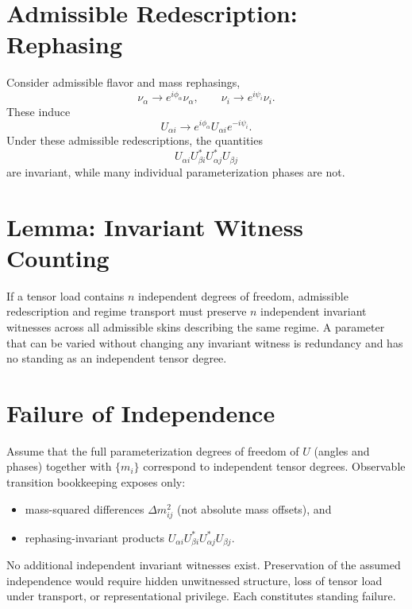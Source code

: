 ﻿\documentclass[11pt]{article}
\begin{document}
\section{Admissible Redescription: Rephasing}
Consider admissible flavor and mass rephasings,
\begin{equation}
\nu_\alpha \rightarrow e^{i\phi_\alpha}\nu_\alpha,
\qquad
\nu_i \rightarrow e^{i\psi_i}\nu_i.
\end{equation}
These induce
\begin{equation}
U_{\alpha i} \rightarrow e^{i\phi_\alpha}U_{\alpha i}e^{-i\psi_i}.
\end{equation}
Under these admissible redescriptions, the quantities
\begin{equation}
U_{\alpha i}U_{\beta i}^*U_{\alpha j}^*U_{\beta j}
\end{equation}
are invariant, while many individual parameterization phases are not.

\section{Lemma: Invariant Witness Counting}
If a tensor load contains $n$ independent degrees of freedom, admissible redescription and regime transport must preserve $n$ independent invariant witnesses across all admissible skins describing the same regime. A parameter that can be varied without changing any invariant witness is redundancy and has no standing as an independent tensor degree.

\section{Failure of Independence}
Assume that the full parameterization degrees of freedom of $U$ (angles and phases) together with $\{m_i\}$ correspond to independent tensor degrees. Observable transition bookkeeping exposes only:
\begin{itemize}
\item mass-squared differences $\Delta m_{ij}^2$ (not absolute mass offsets), and
\item rephasing-invariant products $U_{\alpha i}U_{\beta i}^*U_{\alpha j}^*U_{\beta j}$.
\end{itemize}
No additional independent invariant witnesses exist. Preservation of the assumed independence would require hidden unwitnessed structure, loss of tensor load under transport, or representational privilege. Each constitutes standing failure.
\end{document}
